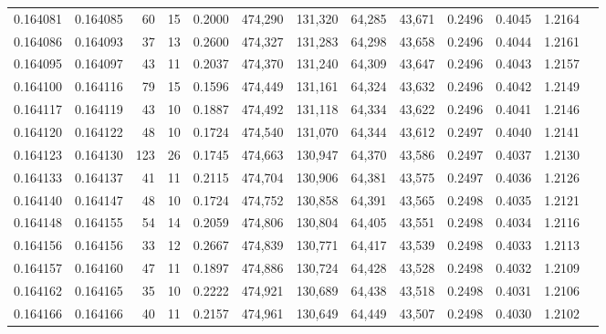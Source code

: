 \begin{tabular}{rrrrrrrrrrrrr}
0.164081 & 0.164085 &    60 &  15 &                                     0.2000 & 474,290 & 131,320 &  64,285 &  43,671 & 0.2496 & 0.4045 & 1.2164 \\
0.164086 & 0.164093 &    37 &  13 &                                     0.2600 & 474,327 & 131,283 &  64,298 &  43,658 & 0.2496 & 0.4044 & 1.2161 \\
0.164095 & 0.164097 &    43 &  11 &                                     0.2037 & 474,370 & 131,240 &  64,309 &  43,647 & 0.2496 & 0.4043 & 1.2157 \\
0.164100 & 0.164116 &    79 &  15 &                                     0.1596 & 474,449 & 131,161 &  64,324 &  43,632 & 0.2496 & 0.4042 & 1.2149 \\
0.164117 & 0.164119 &    43 &  10 &                                     0.1887 & 474,492 & 131,118 &  64,334 &  43,622 & 0.2496 & 0.4041 & 1.2146 \\
0.164120 & 0.164122 &    48 &  10 &                                     0.1724 & 474,540 & 131,070 &  64,344 &  43,612 & 0.2497 & 0.4040 & 1.2141 \\
0.164123 & 0.164130 &   123 &  26 &                                     0.1745 & 474,663 & 130,947 &  64,370 &  43,586 & 0.2497 & 0.4037 & 1.2130 \\
0.164133 & 0.164137 &    41 &  11 &                                     0.2115 & 474,704 & 130,906 &  64,381 &  43,575 & 0.2497 & 0.4036 & 1.2126 \\
0.164140 & 0.164147 &    48 &  10 &                                     0.1724 & 474,752 & 130,858 &  64,391 &  43,565 & 0.2498 & 0.4035 & 1.2121 \\
0.164148 & 0.164155 &    54 &  14 &                                     0.2059 & 474,806 & 130,804 &  64,405 &  43,551 & 0.2498 & 0.4034 & 1.2116 \\
0.164156 & 0.164156 &    33 &  12 &                                     0.2667 & 474,839 & 130,771 &  64,417 &  43,539 & 0.2498 & 0.4033 & 1.2113 \\
0.164157 & 0.164160 &    47 &  11 &                                     0.1897 & 474,886 & 130,724 &  64,428 &  43,528 & 0.2498 & 0.4032 & 1.2109 \\
0.164162 & 0.164165 &    35 &  10 &                                     0.2222 & 474,921 & 130,689 &  64,438 &  43,518 & 0.2498 & 0.4031 & 1.2106 \\
0.164166 & 0.164166 &    40 &  11 &                                     0.2157 & 474,961 & 130,649 &  64,449 &  43,507 & 0.2498 & 0.4030 & 1.2102 \\

\end{tabular}
